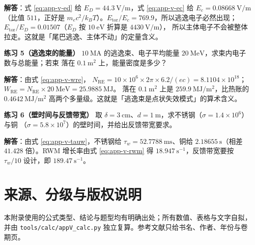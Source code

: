 \textbf{解答}：式 \eqref{eq:app-v-ed} 给 $E_D=44.3\ \mathrm{V/m}$，式
\eqref{eq:app-v-ec} 给 $E_c=0.08668\ \mathrm{V/m}$（比值 $511$，正好是
$m_ec^2/k_BT$）。$E_{\mathrm{tor}}/E_c=769.9$，所以逃逸电子必然出现；
$E_{\mathrm{tor}}/E_D=0.01507$（$E_D$ 按 $10\ \mathrm{eV}$ 折算是 $4430\ \mathrm{V/m}$），
所以主体电子不会被整体拉走。这就是「尾巴逃逸、主体不动」的定量含义。

\textbf{练习 5（逃逸束的能量）}
$10\ \mathrm{MA}$ 的逃逸束、电子平均能量 $20\ \mathrm{MeV}$，求束内电子数与总能量；若束
落在 $0.1\ \mathrm{m^2}$ 上，能量密度是多少？

\textbf{解答}：由式 \eqref{eq:app-v-wre}，
$N_{\mathrm{RE}}=10\times10^{6}\times2\pi\times6.2/(e c)=8.1104\times10^{18}$；
$W_{\mathrm{RE}}=N_{\mathrm{RE}}\times20\ \mathrm{MeV}=25.9885\ \mathrm{MJ}$。
落在 $0.1\ \mathrm{m^2}$ 上是 $259.9\ \mathrm{MJ/m^2}$，比热账的
$0.4642\ \mathrm{MJ/m^2}$ 高两个多量级。这就是「逃逸束是点状失效模式」的算术含义。

\textbf{练习 6（壁时间与反馈带宽）}
取 $\delta=3\ \mathrm{cm}$、$d=1\ \mathrm{m}$，求不锈钢（$\sigma=1.4\times10^6$）与铜
（$\sigma=5.8\times10^7$）的壁时间，并给出反馈带宽要求。

\textbf{解答}：由式 \eqref{eq:app-v-tauw}，不锈钢给 $\tau_w=52.7788\ \mathrm{ms}$、铜给
$2.18655\ \mathrm{s}$（相差 $41.428$ 倍）。RWM 增长率由式 \eqref{eq:app-v-rwm} 得
$18.947\ \mathrm{s^{-1}}$，反馈带宽要按 $\tau_w/10$ 设计，即 $189.47\ \mathrm{s^{-1}}$。

\section{来源、分级与版权说明}
\label{sec:app-v-source}

\begingroup\small
本附录使用的公式类型、结论与题型均有明确出处；所有数值、表格与文字自拟，并由
\texttt{tools/\allowbreak{}calc/\allowbreak{}appV\_calc.py} 独立复算。参考文献只给书名、作者、年份与卷期页。

